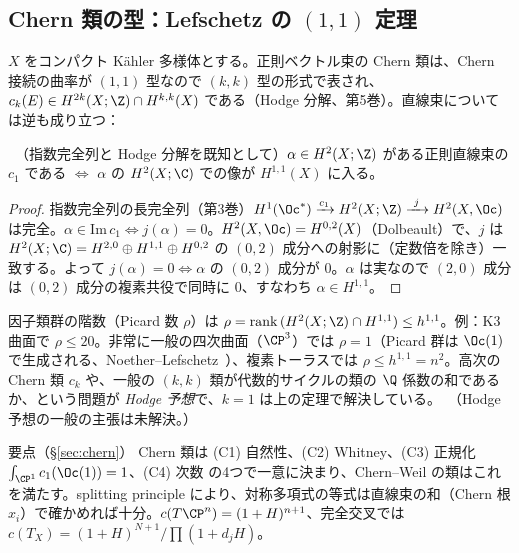 \subsection{Chern 類の型：Lefschetz の $(1,1)$ 定理}
$X$ をコンパクト Kähler 多様体とする。正則ベクトル束の Chern 類は、Chern 接続の曲率が $(1,1)$ 型なので $(k,k)$ 型の形式で表され、$c_k(E)\in H^{2k}(X;\Z)\cap H^{k,k}(X)$ である（Hodge 分解、第5巻）。直線束については逆も成り立つ：
\begin{thm}[Lefschetz の $(1,1)$ 定理]\label{thm:Lef11}\tP\ （指数完全列と Hodge 分解を既知として）$\alpha\in H^2(X;\Z)$ がある正則直線束の $c_1$ である $\iff$ $\alpha$ の $H^2(X;\C)$ での像が $H^{1,1}(X)$ に入る。
\end{thm}
\begin{proof}
指数完全列の長完全列（第3巻）$H^1(\Oc^*)\xrightarrow{c_1}H^2(X;\Z)\xrightarrow{\ j\ }H^2(X,\Oc)$ は完全。$\alpha\in\mathrm{Im}\,c_1\iff j(\alpha)=0$。$H^2(X,\Oc)=H^{0,2}(X)$（Dolbeault）で、$j$ は $H^2(X;\C)=H^{2,0}\oplus H^{1,1}\oplus H^{0,2}$ の $(0,2)$ 成分への射影に（定数倍を除き）一致する。よって $j(\alpha)=0\iff\alpha$ の $(0,2)$ 成分が $0$。$\alpha$ は実なので $(2,0)$ 成分は $(0,2)$ 成分の複素共役で同時に $0$、すなわち $\alpha\in H^{1,1}$。
\end{proof}
\noindent 因子類群の階数（Picard 数 $\rho$）は $\rho=\mathrm{rank}\,(H^2(X;\Z)\cap H^{1,1})\le h^{1,1}$。例：K3 曲面で $\rho\le20$。非常に一般の四次曲面（$\CP^3$）では $\rho=1$（Picard 群は $\Oc(1)$ で生成される、Noether--Lefschetz\tC\ ）、複素トーラスでは $\rho\le h^{1,1}=n^2$。高次の Chern 類 $c_k$ や、一般の $(k,k)$ 類が代数的サイクルの類の $\Q$ 係数の和であるか、という問題が \emph{Hodge 予想}で、$k=1$ は上の定理で解決している。\tC\ （Hodge 予想の一般の主張は未解決。）
\begin{keybox}{要点（\S\ref{sec:chern}）}
Chern 類は (C1) 自然性、(C2) Whitney、(C3) 正規化 $\int_{\CP^1}c_1(\Oc(1))=1$、(C4) 次数 の4つで一意に決まり、Chern--Weil の類はこれを満たす。splitting principle により、対称多項式の等式は直線束の和（Chern 根 $x_i$）で確かめれば十分。$c(T\CP^n)=(1+H)^{n+1}$、完全交叉では $c(T_X)=(1+H)^{N+1}/\prod(1+d_jH)$。
\end{keybox}

